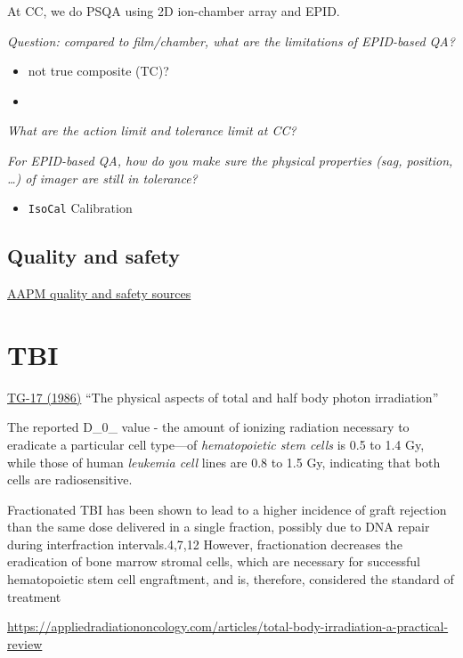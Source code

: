 \documentclass[]{book}
\providecommand{\tightlist}{%
  \setlength{\itemsep}{0pt}\setlength{\parskip}{0pt}}
\theoremstyle{definition}
\theoremstyle{definition}
\theoremstyle{definition}
\theoremstyle{remark}
\begin{document}
At CC, we do PSQA using 2D ion-chamber array and EPID.

\emph{Question: compared to film/chamber, what are the limitations of
EPID-based QA?}

\begin{itemize}
\item
  not true composite (TC)?
\item
\end{itemize}

\emph{What are the action limit and tolerance limit at CC?}

\emph{For EPID-based QA, how do you make sure the physical properties
(sag, position, \ldots{}) of imager are still in tolerance?}

\begin{itemize}
\tightlist
\item
  \texttt{IsoCal} Calibration
\end{itemize}

\section{Quality and safety}\label{quality-and-safety}

\href{https://www.aapm.org/QualitySafety/default.asp}{AAPM quality and
safety sources}

\chapter{TBI}\label{tbi}

\href{https://aapm.org/pubs/reports/RPT_17.pdf}{TG-17 (1986)} ``The
physical aspects of total and half body photon irradiation''

The reported D\_0\_ value - the amount of ionizing radiation necessary
to eradicate a particular cell type---of \emph{hematopoietic stem cells}
is 0.5 to 1.4 Gy, while those of human \emph{leukemia cell} lines are
0.8 to 1.5 Gy, indicating that both cells are radiosensitive.

Fractionated TBI has been shown to lead to a higher incidence of graft
rejection than the same dose delivered in a single fraction, possibly
due to DNA repair during interfraction intervals.4,7,12 However,
fractionation decreases the eradication of bone marrow stromal cells,
which are necessary for successful hematopoietic stem cell engraftment,
and is, therefore, considered the standard of treatment

\url{https://appliedradiationoncology.com/articles/total-body-irradiation-a-practical-review}
\end{document}

